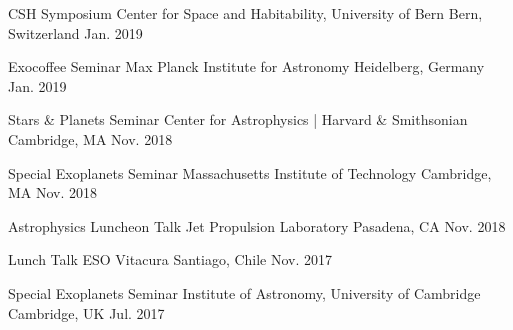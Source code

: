 

\begin{cvhonors}

  \cvhonor
    {CSH Symposium} %
    {Center for Space and Habitability, University of Bern} %
    {Bern, Switzerland} %
    {Jan. 2019} %
    
  \cvhonor
    {Exocoffee Seminar} %
    {Max Planck Institute for Astronomy} %
    {Heidelberg, Germany} %
    {Jan. 2019} %
    
  \cvhonor
    {Stars \& Planets Seminar} %
    {Center for Astrophysics | Harvard \& Smithsonian} %
    {Cambridge, MA} %
    {Nov. 2018} %
    
  \cvhonor
    {Special Exoplanets Seminar} %
    {Massachusetts Institute of Technology} %
    {Cambridge, MA} %
    {Nov. 2018} %

  \cvhonor
    {Astrophysics Luncheon Talk} %
    {Jet Propulsion Laboratory} %
    {Pasadena, CA} %
    {Nov. 2018} %

  \cvhonor
    {Lunch Talk} %
    {ESO Vitacura} %
    {Santiago, Chile} %
    {Nov. 2017} %

  \cvhonor
    {Special Exoplanets Seminar} %
    {Institute of Astronomy, University of Cambridge} %
    {Cambridge, UK} %
    {Jul. 2017} %


\end{cvhonors}